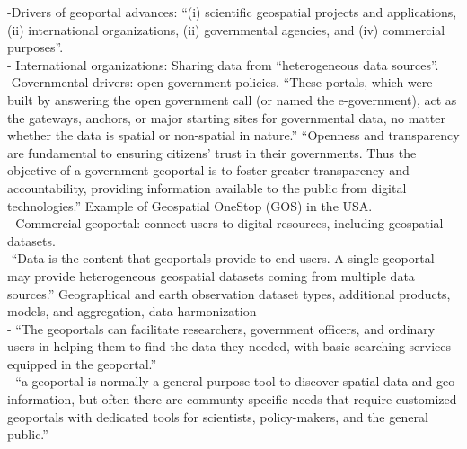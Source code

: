 -{\color{orange}Drivers of geoportal advances: “(i) scientific geospatial projects and applications, (ii) international organizations, (ii) governmental agencies, and (iv) commercial purposes”.\cite{Jiang2020}}\\
- {\color{orange} International organizations: Sharing data from “heterogeneous data sources”. \cite{Jiang2020}}\\
-{\color{orange}Governmental drivers: open government policies. “These portals, which were built by answering the open government call (or named the e-government), act as the gateways, anchors, or major starting sites for governmental data, no matter whether the data is spatial or non-spatial in nature.” “Openness and transparency are fundamental to ensuring citizens’ trust in their governments. Thus the objective of a government geoportal is to foster greater transparency and accountability, providing information available to the public from digital technologies.” Example of Geospatial OneStop (GOS) in the USA.\cite{Jiang2020}}\\
-{\color{orange} Commercial geoportal: connect users to digital resources, including geospatial datasets.\cite{Jiang2020}}\\
-{\color{orange}“Data is the content that geoportals provide to end users. A single geoportal may provide heterogeneous geospatial datasets coming from multiple data sources.”  Geographical and earth observation dataset types, additional products, models, and aggregation, data harmonization\cite{Jiang2020}}\\
-{\color{orange} “The geoportals can facilitate researchers, government officers, and ordinary users in helping them to find the data they needed, with basic searching services equipped in the geoportal.”\cite{Jiang2020}}\\
-{\color{orange} “a geoportal is normally a general-purpose tool to discover spatial data and geo-information, but often there are communty-specific needs that require customized geoportals with dedicated tools for scientists, policy-makers, and the general public.” \cite{Jiang2020}}\\%
